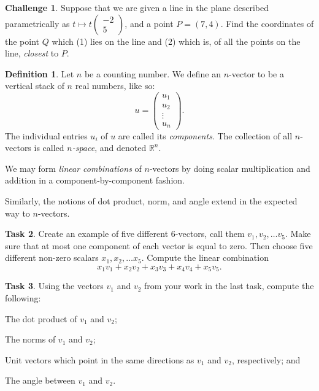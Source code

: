 \documentclass{tufte-book}
\theoremstyle{definition}
\newtheorem{task}{Task}
\newtheorem{challenge}[task]{Challenge}
\newtheorem*{definition}{Definition}
\begin{document}
\begin{challenge}
Suppose that we are given a line in the plane described parametrically as 
$t \mapsto t\left(\begin{smallmatrix} -2 \\ 5\end{smallmatrix}\right)$,
and a point $P = (7,4)$. Find the coordinates of the point $Q$ which (1) lies on the line and (2) which is, of all the points on the line, \emph{closest} to $P$.
\end{challenge}

\begin{definition}
Let $n$ be a counting number. We define an $n$-vector to be a vertical stack of $n$ real numbers, like so:
\[
u = \begin{pmatrix} u_1 \\ u_2 \\ \vdots \\ u_n \end{pmatrix} .
\]
The individual entries $u_i$ of $u$ are called its \emph{components}.
The collection of all $n$-vectors is called \emph{$n$-space}, and denoted $\mathbb{R}^n$.

We may form \emph{linear combinations} of $n$-vectors by doing scalar multiplication and addition in a component-by-component fashion.

Similarly, the notions of dot product, norm, and angle extend in the expected way to $n$-vectors.
\end{definition}

\begin{task}
Create an example of five different $6$-vectors, call them $v_1, v_2, \ldots v_5$. Make sure that at most one component of each vector is equal to zero. Then choose five different non-zero scalars $x_1, x_2, \ldots x_5$. Compute the linear combination
\[
x_1 v_1 + x_2 v_2 + x_3 v_3 + x_4 v_4 + x_5 v_5.
\]
\end{task}

\begin{task}
Using the vectors $v_1$ and $v_2$ from your work in the last task, compute the following:
\begin{compactitem}
\item The dot product of $v_1$ and $v_2$;
\item The norms of $v_1$ and $v_2$;
\item Unit vectors which point in the same directions as $v_1$ and $v_2$, respectively; and
\item The angle between $v_1$ and $v_2$.
\end{compactitem}
\end{task}
\end{document}
